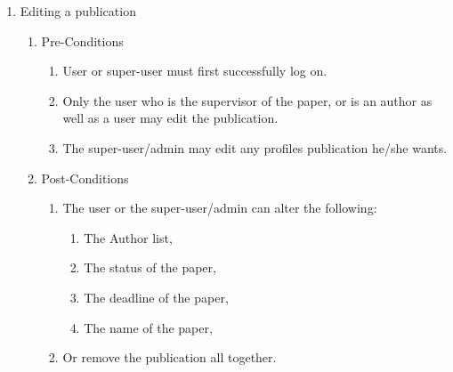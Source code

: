 \documentclass{article} %
\begin{document}
	\begin{enumerate}
		\item  Editing a publication
		
		\begin{enumerate}
			\item  Pre-Conditions
			
			\begin{enumerate}
				\item  User or super-user must first successfully log on.
				
				\item  Only the user who is the supervisor of the paper, or is an author as well as a user may edit the publication.
				
				\item  The super-user/admin may edit any profiles publication he/she wants.
			\end{enumerate}
			
			\item  Post-Conditions
			
			\begin{enumerate}
				\item  The user or the super-user/admin can alter the following:
				
				\begin{enumerate}
					\item  The Author list,
					
					\item  The status of the paper,
					
					\item  The deadline of the paper,
					
					\item  The name of the paper,
				\end{enumerate}
				
				\item  Or remove the publication all together.
			\end{enumerate}
		\end{enumerate}
	\end{enumerate}
	
	\noindent 
	
	\noindent 
	
\end{document}
